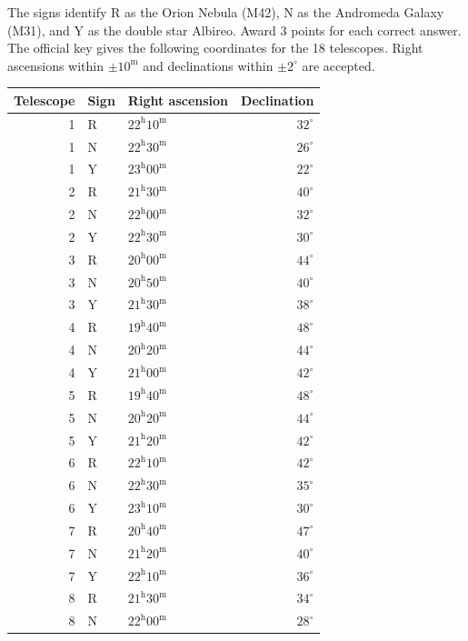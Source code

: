 The signs identify R as the Orion Nebula (M42), N as the Andromeda Galaxy (M31), and Y as the double star Albireo. Award 3 points for each correct answer. The official key gives the following coordinates for the 18 telescopes. Right ascensions within $\pm10^{\mathrm m}$ and declinations within $\pm2^\circ$ are accepted.
\begin{longtable}{rllr}
Telescope & Sign & Right ascension & Declination\\
\hline
\endhead
1 & R & $22^{\mathrm h}10^{\mathrm m}$ & $32^\circ$ \\
1 & N & $22^{\mathrm h}30^{\mathrm m}$ & $26^\circ$ \\
1 & Y & $23^{\mathrm h}00^{\mathrm m}$ & $22^\circ$ \\
2 & R & $21^{\mathrm h}30^{\mathrm m}$ & $40^\circ$ \\
2 & N & $22^{\mathrm h}00^{\mathrm m}$ & $32^\circ$ \\
2 & Y & $22^{\mathrm h}30^{\mathrm m}$ & $30^\circ$ \\
3 & R & $20^{\mathrm h}00^{\mathrm m}$ & $44^\circ$ \\
3 & N & $20^{\mathrm h}50^{\mathrm m}$ & $40^\circ$ \\
3 & Y & $21^{\mathrm h}30^{\mathrm m}$ & $38^\circ$ \\
4 & R & $19^{\mathrm h}40^{\mathrm m}$ & $48^\circ$ \\
4 & N & $20^{\mathrm h}20^{\mathrm m}$ & $44^\circ$ \\
4 & Y & $21^{\mathrm h}00^{\mathrm m}$ & $42^\circ$ \\
5 & R & $19^{\mathrm h}40^{\mathrm m}$ & $48^\circ$ \\
5 & N & $20^{\mathrm h}20^{\mathrm m}$ & $44^\circ$ \\
5 & Y & $21^{\mathrm h}20^{\mathrm m}$ & $42^\circ$ \\
6 & R & $22^{\mathrm h}10^{\mathrm m}$ & $42^\circ$ \\
6 & N & $22^{\mathrm h}30^{\mathrm m}$ & $35^\circ$ \\
6 & Y & $23^{\mathrm h}10^{\mathrm m}$ & $30^\circ$ \\
7 & R & $20^{\mathrm h}40^{\mathrm m}$ & $47^\circ$ \\
7 & N & $21^{\mathrm h}20^{\mathrm m}$ & $40^\circ$ \\
7 & Y & $22^{\mathrm h}10^{\mathrm m}$ & $36^\circ$ \\
8 & R & $21^{\mathrm h}30^{\mathrm m}$ & $34^\circ$ \\
8 & N & $22^{\mathrm h}00^{\mathrm m}$ & $28^\circ$ \\

\end{longtable}
